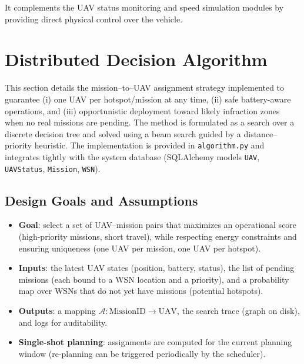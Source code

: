 It complements the UAV status monitoring and speed simulation modules by providing direct physical control over the vehicle.





\section{Distributed Decision Algorithm}

This section details the mission--to--UAV assignment strategy implemented to guarantee
(i) one UAV per hotspot/mission at any time, (ii) safe battery-aware operations, and
(iii) opportunistic deployment toward likely infraction zones when no real missions are pending.
The method is formulated as a search over a discrete decision tree and solved using a
beam search guided by a distance--priority heuristic. The implementation is provided in
\texttt{algorithm.py} and integrates tightly with the system database (SQLAlchemy models
\texttt{UAV}, \texttt{UAVStatus}, \texttt{Mission}, \texttt{WSN}).

\subsection*{Design Goals and Assumptions}
\begin{itemize}
  \item \textbf{Goal}: select a set of UAV--mission pairs that maximizes an operational score
        (high-priority missions, short travel), while respecting energy constraints and ensuring
        uniqueness (one UAV per mission, one UAV per hotspot).
  \item \textbf{Inputs}: the latest UAV states (position, battery, status), the list of pending missions
        (each bound to a WSN location and a priority), and a probability map over WSNs that do not
        yet have missions (potential hotspots).
  \item \textbf{Outputs}: a mapping \(\mathcal{A}: \text{MissionID} \rightarrow \text{UAV}\), the search trace
        (graph on disk), and logs for auditability.
  \item \textbf{Single-shot planning}: assignments are computed for the current planning window
        (re-planning can be triggered periodically by the scheduler).
\end{itemize}

